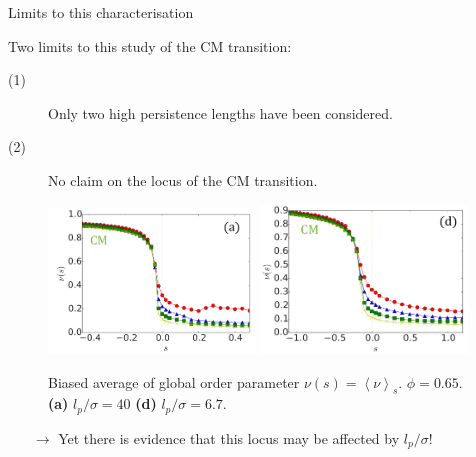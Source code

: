 \documentclass{beamer}
\begin{document}
\begin{frame}{Limits to this characterisation}

Two limits to this study of the CM transition:
\begin{description}
  \item[(1)] Only two high persistence lengths have been considered.
  \item[(2)] No claim on the locus of the CM transition.
\end{description}

\begin{figure}
\centering
\includegraphics[width=0.49\textwidth]{Nemoto_2019_fig2a.png}
\hfill
\includegraphics[width=0.49\textwidth]{Nemoto_2019_fig3d.png}
\caption{Biased average of global order parameter $\nu(s) = \left<\nu\right>_s$. $\phi = 0.65$. {\bf (a)} $l_p/\sigma = 40$ {\bf (d)} $l_p/\sigma = 6.7$. }
\end{figure}

\begin{itemize}
  \item[$\rightarrow$] Yet there is evidence that this locus may be affected by $l_p/\sigma$!
\end{itemize}

\end{frame}
\end{document}
